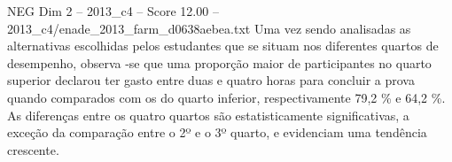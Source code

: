 \begin{textsample}{NEG Dim 2 – 2013\_c4 – Score 12.00 – 2013\_c4/enade\_2013\_farm\_d0638aebea.txt}
Uma vez sendo analisadas as alternativas escolhidas pelos estudantes que se situam nos diferentes quartos de desempenho, observa -se que uma proporção maior de participantes no quarto superior declarou ter gasto entre duas e quatro horas para concluir a prova quando comparados com os do quarto inferior, respectivamente 79,2 \% e 64,2 \%.
As diferenças entre os quatro quartos são estatisticamente significativas, a exceção da comparação entre o 2º e o 3º quarto, e evidenciam uma tendência crescente.

\end{textsample}
